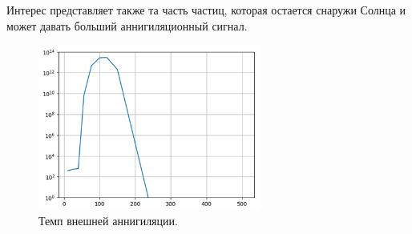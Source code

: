 Интерес представляет также та часть частиц, которая остается снаружи Солнца и может давать больший аннигиляционный сигнал.
\begin{figure}[!h]
	\centering
	\includegraphics[width=0.65\textwidth]{images/Aout.png}
	\caption{Темп внешней аннигиляции.}
\end{figure}